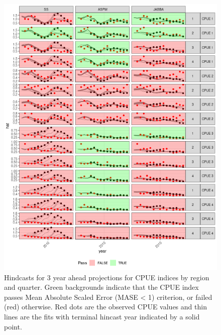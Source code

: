 \documentclass[12pt,halfline,a4paper,nonumbib]{ouparticle}
\begin{document}
\begin{figure}[htbp]
\centering
\includegraphics[width=6in]{figures/final-hy3-plot-1.png}
\caption{Hindcasts for 3 year ahead projections for CPUE indices by region and quarter. Green backgrounds indicate that the CPUE index passes Mean Absolute Scaled Error (MASE < 1) criterion, or failed (red) otherwise. Red dots are the observed CPUE values and thin lines are the fits with terminal hincast year indicated by a solid point.}
\label{fig:hy3}
\end{figure}
\end{document}
